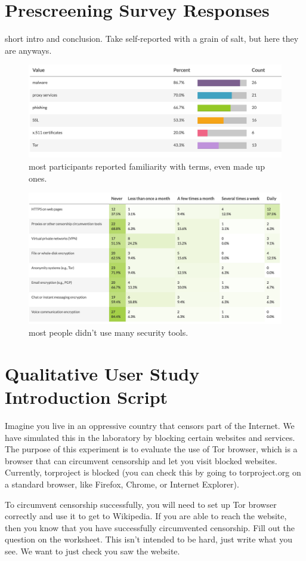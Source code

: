 \documentclass[USenglish,oneside,twocolumn]{article}
\begin{document}
\section{Prescreening Survey Responses}
\label{prescreening-responses}
{\color{blue} 
short intro and conclusion. Take self-reported with a grain of salt, but here they are anyways. 

\begin{figure}[t]
\centering
\includegraphics[width=.5\textwidth]{self-reported-tech-familiarity.png}
\caption{most participants reported familiarity with terms, even made up ones.}
\end{figure}

\begin{figure}[t]
\centering
\includegraphics[width=.5\textwidth]{self-reported-security-use.png}
\caption{most people didn't use many security tools.}
\end{figure}
}

\section{Qualitative User Study Introduction Script} 
\label{qualitative-script} 
Imagine you live in an oppressive country that censors part of the Internet. We have simulated this in the laboratory by blocking certain websites and services.  The purpose of this experiment is to evaluate the use of Tor browser, which is a browser that can circumvent censorship and let you visit blocked websites. Currently, torproject is blocked (you can check this by going to torproject.org on a standard browser, like Firefox, Chrome, or Internet Explorer). 

To circumvent censorship successfully, you will need to set up Tor browser correctly and use it to get to Wikipedia. If you are able to reach the website, then you know that you have successfully circumvented censorship. Fill out the question on the worksheet. This isn't intended to be hard, just write what you see. We want to just check you saw the website. 
\end{document}
